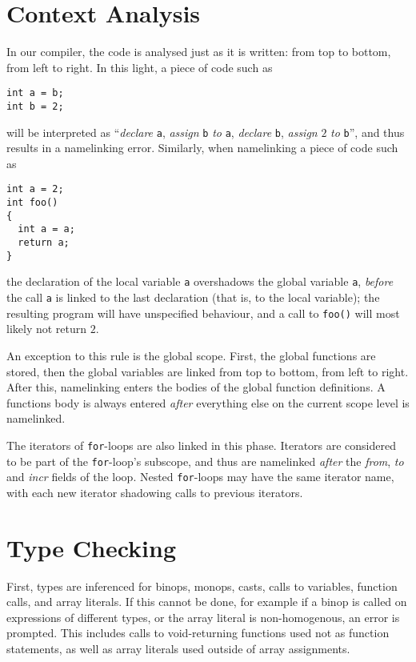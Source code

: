 \documentclass[a4paper,11pt]{report}
\begin{document}
\section{Context Analysis}
In our compiler, the code is analysed just as it is written: from top to bottom, from left to right. In this light, a piece of code such as
\begin{verbatim}
int a = b;
int b = 2;
\end{verbatim}
will be interpreted as ``\emph{declare} \texttt{a}, \emph{assign} \texttt{b} \emph{to} \texttt{a}, \emph{declare} \texttt{b}, \emph{assign} $2$ \emph{to} \texttt{b}'', and thus results in a namelinking error. Similarly, when namelinking a piece of code such as
\begin{verbatim}
int a = 2;
int foo()
{
  int a = a;
  return a;
}
\end{verbatim}
the declaration of the local variable \texttt{a} overshadows the global variable \texttt{a}, \emph{before} the call \texttt{a} is linked to the last declaration (that is, to the local variable); the resulting program will have unspecified behaviour, and a call to \texttt{foo()} will most likely not return $2$.

An exception to this rule is the global scope. First, the global functions are stored, then the global variables are linked from top to bottom, from left to right. After this, namelinking enters the bodies of the global function definitions. A functions body is always entered \emph{after} everything else on the current scope level is namelinked.

The iterators of \texttt{for}-loops are also linked in this phase. Iterators are considered to be part of the \texttt{for}-loop's subscope, and thus are namelinked \emph{after} the \emph{from}, \emph{to} and \emph{incr} fields of the loop. Nested \texttt{for}-loops may have the same iterator name, with each new iterator shadowing calls to previous iterators.

\section{Type Checking}
First, types are inferenced for binops, monops, casts, calls to variables, function calls, and array literals. If this cannot be done, for example if a binop is called on expressions of different types, or the array literal is non-homogenous, an error is prompted. This includes calls to void-returning functions used not as function statements, as well as array literals used outside of array assignments.
\end{document}
